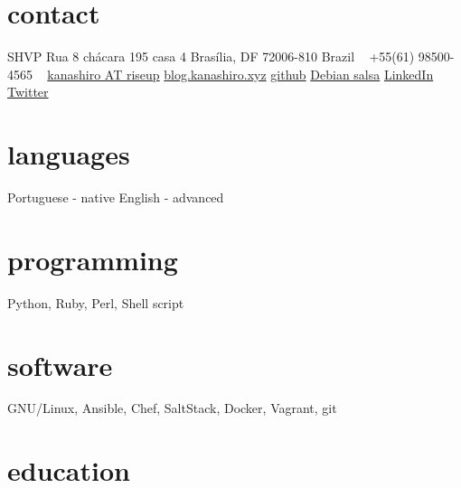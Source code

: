 \documentclass[print]{friggeri-cv}
\begin{document}


\begin{aside} %
\section{contact}
SHVP Rua 8 chácara 195 casa 4
Brasília, DF 72006-810
Brazil
~
+55(61) 98500-4565
~
\href{mailto:kanashiro@riseup.net}{kanashiro AT riseup}
\href{http://blog.kanashiro.xyz}{blog.kanashiro.xyz}
\href{https://github.com/lucaskanashiro}{github}
\href{https://salsa.debian.org/kanashiro}{Debian salsa}
\href{https://www.linkedin.com/in/lucas-kanashiro-076821ba/}{LinkedIn}
\href{https://twitter.com/lucas\_kanashiro}{Twitter}
\section{languages}
Portuguese - native
English - advanced
\section{programming}
Python, Ruby, Perl, Shell script 
\section{software}
GNU/Linux, Ansible, Chef, SaltStack, Docker, Vagrant, git
\end{aside}


\section{education}
\end{document}
